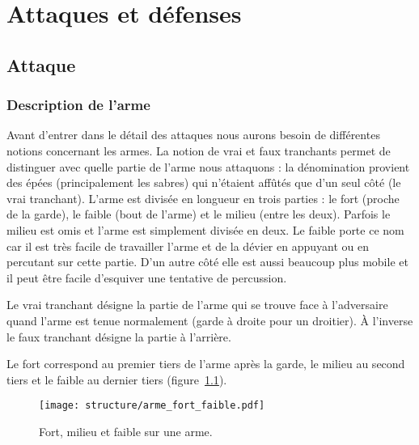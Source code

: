 \chapter{Attaques et défenses}


\section{Attaque}
\label{sec:att-def:attaque}


\subsection{Description de l'arme}


Avant d'entrer dans le détail des attaques nous aurons besoin de différentes notions concernant les armes.
La notion de vrai et faux tranchants permet de distinguer avec quelle partie de l'arme nous attaquons : la dénomination provient des épées (principalement les sabres) qui n'étaient affûtés que d'un seul côté (le vrai tranchant).
L'arme est divisée en longueur en trois parties : le fort (proche de la garde), le faible (bout de l'arme) et le milieu (entre les deux).
Parfois le milieu est omis et l'arme est simplement divisée en deux.
Le faible porte ce nom car il est très facile de travailler l'arme et de la dévier en appuyant ou en percutant sur cette partie.
D'un autre côté elle est aussi beaucoup plus mobile et il peut être facile d'esquiver une tentative de percussion.


\begin{definition}
	\label{att:def:tranchant}

	Le vrai tranchant désigne la partie de l'arme qui se trouve face à l'adversaire quand l'arme est tenue normalement (garde à droite pour un droitier).
	À l'inverse le faux tranchant désigne la partie à l'arrière.
\end{definition}


\begin{definition}
	\label{att:def:fort-faible}

	Le fort correspond au premier tiers de l'arme après la garde, le milieu au second tiers et le faible au dernier tiers (figure~\ref{att:fig:arme-fort-faible}).
\end{definition}


\begin{figure}[ht]
	\centering
	\texttt{[image: structure/arme\_fort\_faible.pdf]}
	\caption{Fort, milieu et faible sur une arme.}
	\label{att:fig:arme-fort-faible}
\end{figure}


